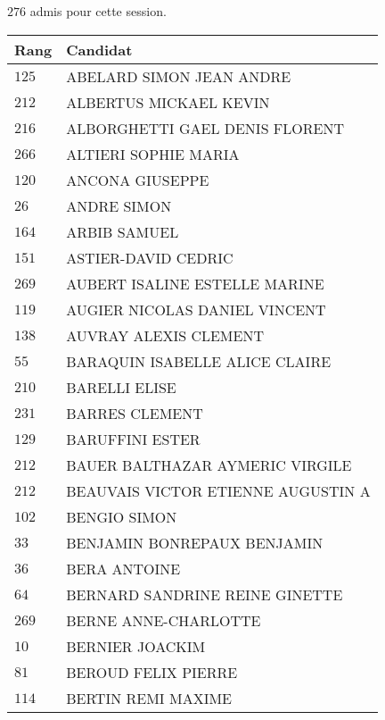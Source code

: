 




  $276$ admis pour cette session.

  \begin{xltabular}{\linewidth}{|l|X|}
    \hline
    \textbf{Rang} & \textbf{Candidat} \\
    \hline
    $125$ & ABELARD SIMON JEAN ANDRE \\
    \hline
    $212$ & ALBERTUS MICKAEL KEVIN \\
    \hline
    $216$ & ALBORGHETTI GAEL DENIS FLORENT \\
    \hline
    $266$ & ALTIERI SOPHIE MARIA \\
    \hline
    $120$ & ANCONA GIUSEPPE \\
    \hline
    $26$ & ANDRE SIMON \\
    \hline
    $164$ & ARBIB SAMUEL \\
    \hline
    $151$ & ASTIER-DAVID CEDRIC \\
    \hline
    $269$ & AUBERT ISALINE ESTELLE MARINE \\
    \hline
    $119$ & AUGIER NICOLAS DANIEL VINCENT \\
    \hline
    $138$ & AUVRAY ALEXIS CLEMENT \\
    \hline
    $55$ & BARAQUIN ISABELLE ALICE CLAIRE \\
    \hline
    $210$ & BARELLI ELISE \\
    \hline
    $231$ & BARRES CLEMENT \\
    \hline
    $129$ & BARUFFINI ESTER \\
    \hline
    $212$ & BAUER BALTHAZAR AYMERIC VIRGILE \\
    \hline
    $212$ & BEAUVAIS VICTOR ETIENNE AUGUSTIN A \\
    \hline
    $102$ & BENGIO SIMON \\
    \hline
    $33$ & BENJAMIN BONREPAUX BENJAMIN \\
    \hline
    $36$ & BERA ANTOINE \\
    \hline
    $64$ & BERNARD SANDRINE REINE GINETTE \\
    \hline
    $269$ & BERNE ANNE-CHARLOTTE \\
    \hline
    $10$ & BERNIER JOACKIM \\
    \hline
    $81$ & BEROUD FELIX PIERRE \\
    \hline
    $114$ & BERTIN REMI MAXIME \\
    \hline

\end{xltabular}
